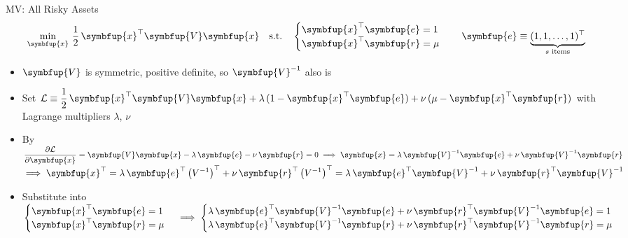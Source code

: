 \documentclass[10pt]{beamer}
\newcommand{\ds}{\displaystyle}
\newcommand{\ie}{\;\Longrightarrow\;}
\newcommand{\vx}{\symbfup{x}}
\newcommand{\vV}{\symbfup{V}}
\newcommand{\ve}{\symbfup{e}}
\newcommand{\vr}{\symbfup{r}}
\theoremstyle{definition}
\begin{document}
\begin{frame}{MV: All Risky Assets}
  \begin{align*}
    \min_{\vx}\,\frac{1}{2}\,\vx^\top\vV\vx\quad\text{s.t.}\quad\begin{cases}\vx^\top\ve = 1 \\\vx^\top\vr = \mu\end{cases}\quad \ve\equiv\underbrace{(1, 1, \ldots, 1)^\top}_{\text{$s$ items}}
  \end{align*}
  \onslide<+->
  \begin{itemize}[<+->]
    \item $\vV$ is symmetric, positive definite, so $\vV^{-1}$ also is
    \item Set $\ds\mathcal{L}\equiv\frac{1}{2}\,\vx^\top\vV\vx + \lambda\,(1 - \vx^\top\ve) + \nu\,(\mu - \vx^\top\vr)$ with Lagrange multipliers $\lambda$, $\nu$
    \item By $\ds\frac{\partial\mathcal{L}}{\partial\vx} = \vV\vx - \lambda\,\ve - \nu\,\vr = 0\ie\vx = \lambda\,\vV^{-1}\ve + \nu\,\vV^{-1}\vr$ $\ds\ie\vx^\top = \lambda\,\ve^\top\left(V^{-1}\right)^\top + \nu\,\vr^\top\left(V^{-1}\right)^\top = \lambda\,\ve^\top\vV^{-1} + \nu\,\vr^\top\vV^{-1}$ 
    \item Substitute into $\ds\begin{cases}\vx^\top\ve = 1 \\\vx^\top\vr = \mu\end{cases}\ie\begin{cases}\lambda\,\ve^\top\vV^{-1}\ve + \nu\,\vr^\top\vV^{-1}\ve = 1 \\ \lambda\,\ve^\top\vV^{-1}\vr + \nu\,\vr^\top\vV^{-1}\vr = \mu\end{cases}$
  \end{itemize}
\end{frame}
\end{document}
